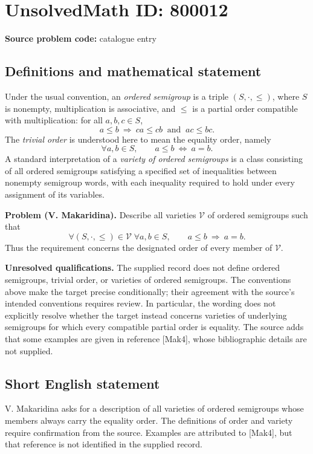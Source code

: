 \documentclass[11pt]{article}
\begin{document}
\section*{UnsolvedMath ID: 800012}
\textbf{Source problem code:} catalogue entry
\subsection{Definitions and mathematical statement}
Under the usual convention, an \emph{ordered semigroup} is a triple \((S,\cdot,\leq)\), where \(S\) is nonempty, multiplication is associative, and \(\leq\) is a partial order compatible with multiplication: for all \(a,b,c\in S\),
\[
a\leq b\ \Longrightarrow\ ca\leq cb\ \text{ and }\ ac\leq bc.
\]
The \emph{trivial order} is understood here to mean the equality order, namely
\[
\forall a,b\in S,\qquad a\leq b\ \Longleftrightarrow\ a=b.
\]
A standard interpretation of a \emph{variety of ordered semigroups} is a class consisting of all ordered semigroups satisfying a specified set of inequalities between nonempty semigroup words, with each inequality required to hold under every assignment of its variables.

\textbf{Problem (V. Makaridina).} Describe all varieties \(\mathcal V\) of ordered semigroups such that
\[
\forall (S,\cdot,\leq)\in\mathcal V\;\forall a,b\in S,
\qquad a\leq b\ \Longrightarrow\ a=b.
\]
Thus the requirement concerns the designated order of every member of \(\mathcal V\).

\textbf{Unresolved qualifications.} The supplied record does not define ordered semigroups, trivial order, or varieties of ordered semigroups. The conventions above make the target precise conditionally; their agreement with the source's intended conventions requires review. In particular, the wording does not explicitly resolve whether the target instead concerns varieties of underlying semigroups for which every compatible partial order is equality. The source adds that some examples are given in reference [Mak4], whose bibliographic details are not supplied.
\subsection{Short English statement}
V. Makaridina asks for a description of all varieties of ordered semigroups whose members always carry the equality order. The definitions of order and variety require confirmation from the source. Examples are attributed to [Mak4], but that reference is not identified in the supplied record.
\end{document}
